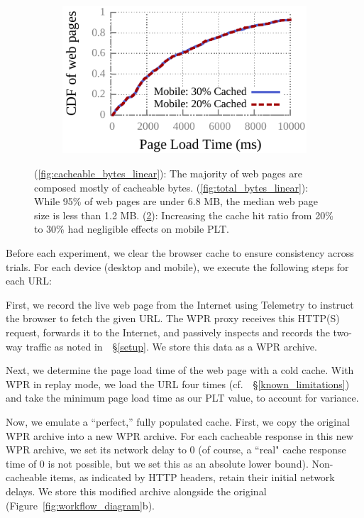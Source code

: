 \begin{figure}[!htb]
\begin{subfigure}{0.33\textwidth}
    \includegraphics[width=\textwidth]{../graphs/partial_cache/partial_cache_linear_PLT.pdf}
    \caption[]{\label{fig:partial_cache_linear}}
\end{subfigure}\hfill
\caption{(\ref{fig:cacheable_bytes_linear}): The majority of web pages are composed mostly of cacheable bytes. (\ref{fig:total_bytes_linear}): While 95\% of web pages are under 6.8 MB, the median web page size is less than 1.2 MB. (\ref{fig:partial_cache_linear}): Increasing the cache hit ratio from 20\% to 30\% had negligible effects on mobile PLT.}
\end{figure}
Before each experiment, we clear the browser cache to ensure consistency across trials. For each device (desktop and mobile), we execute the following steps for each URL:

First, we record the live web page from the Internet using Telemetry to
instruct the browser to fetch the given URL. The WPR proxy receives this
HTTP(S) request, forwards it to the Internet, and passively inspects and
records the two-way traffic as noted in~~\S\ref{setup}. We store this data as
a WPR archive.

Next, we determine the page load time of the web page with a cold cache. With
WPR in replay mode, we load the URL four times (cf.~~\S\ref{known_limitations}) and take the minimum page load time as our PLT value, to account for variance.

Now, we emulate a ``perfect,'' fully populated cache. First, we copy the original WPR archive into a new WPR archive. For each cacheable response in this new WPR archive, we set its network delay to 0 (of course, a ``real" cache response time of 0 is not possible, but we set this as an absolute lower bound). Non-cacheable items, as indicated by HTTP headers, retain their initial network delays. We store this modified archive alongside the original (Figure~\ref{fig:workflow_diagram}b).

